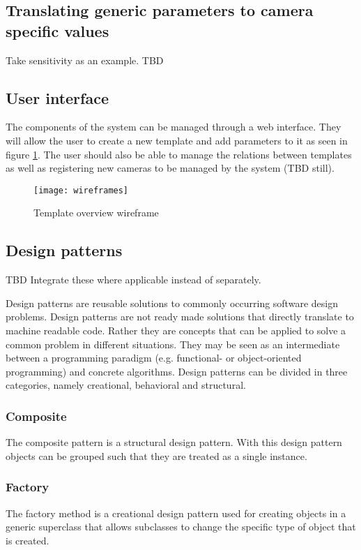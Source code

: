 \subsection{Translating generic parameters to camera specific values}
Take sensitivity as an example. TBD

\subsection{User interface}
The components of the system can be managed through a web interface.
They will allow the user to create a new template and add parameters to it as seen in figure \ref{fig:templatewireframe}.
The user should also be able to manage the relations between templates as well as registering new cameras to be managed by the system (TBD still).
\begin{figure}[H]
	\centering
	\texttt{[image: wireframes]}
	\caption{Template overview  wireframe}
	\label{fig:templatewireframe}
\end{figure}

\subsection{Design patterns}
TBD Integrate these where applicable instead of separately.

Design patterns are reusable solutions to commonly occurring software design problems. Design patterns are not ready made solutions that directly translate to machine readable code. Rather they are concepts that can be applied to solve a common problem in different situations. They may be seen as an intermediate between a programming paradigm (e.g. functional- or object-oriented programming) and
concrete algorithms. Design patterns can be divided in three categories, namely creational, behavioral and structural.

\subsubsection{Composite}
The composite pattern is a structural design pattern. With this design pattern objects can be grouped such that they are treated as a
single instance.

\subsubsection{Factory}
The factory method is a creational design pattern used for creating objects in a generic superclass that allows subclasses to change the
specific type of object that is created.
